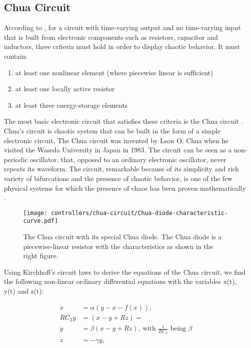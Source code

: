 \documentclass[main]{subfiles}
\begin{document}
\subsection{Chua Circuit}
\label{subsec:chua-circuit}

According to \cite{bib:Kennedy1993}, for a circuit with time-varying output and no time-varying input that is built from electronic components such as resistors, capacitor and inductors, three criteria must hold in order to display chaotic behavior. %
%
It must contain:
\begin{enumerate}
  \item at least one nonlinear element (where piecewise linear is sufficient)
  \item at least one locally active resistor
  \item at least three energy-storage elements
\end{enumerate}
  
The most basic electronic circuit that satisfies these criteria is the Chua circuit \cite{bib:Matsumoto1985}. %
%
Chua's circuit is chaotic system that can be built in the form of a simple electronic circuit. %
%
The Chua circuit was invented by Leon O. Chua when he visited the Waseda University in Japan in 1983. %
%
The circuit can be seen as a non-periodic oscillator, that, opposed to an ordinary electronic oscillator, never repeats its waveform. %
%
The circuit, remarkable because of its simplicity and rich variety of bifurcations and the presence of chaotic behavior, is one of the few physical systems for which the presence of chaos has been proven mathematically \cite{bib:Kennedy1993}.

\begin{figure}[H]
\centering

\texttt{[image: controllers/chua-circuit/Chua-diode-characteristic-curve.pdf]}
\caption[The Chua circuit]{The Chua circuit with its special Chua diode. The Chua diode is a piecewise-linear resistor with the characteristics as shown in the right figure.}
\label{figure:chuacircuit}
\end{figure}

Using Kirchhoff's circuit laws to derive the equations of the Chua circuit, we find the following non-linear ordinary differential equations with the variables x(t), y(t) and z(t):

\begin{align*}
\dot{x}&=\alpha (y-x-f(x)),\\
RC_2\dot{y}&= (x-y+Rz) =\\
\dot{y}&=\beta (x-y+Rz),\:\text{with } \frac{1}{RC_2} \text{ being }\beta\\
\dot{z}&=-\gamma y,\\
\end{align*}
\end{document}
